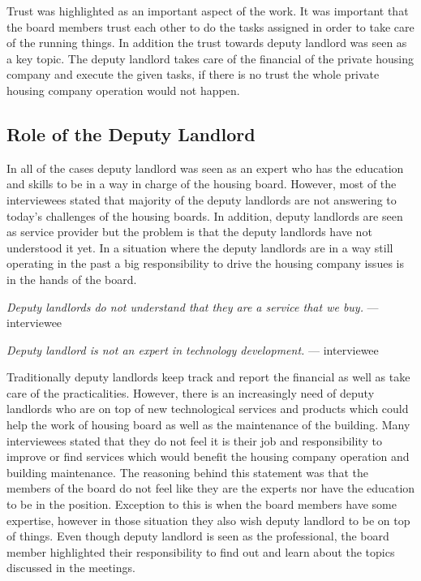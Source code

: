 Trust was highlighted as an important aspect of the work. It was important that the board members trust each other to do the tasks assigned in order to take care of the running things. In addition the trust towards deputy landlord was seen as a key topic. The deputy landlord takes care of the financial of the private housing company and execute the given tasks, if there is no trust the whole private housing company operation would not happen.

\subsection{Role of the Deputy Landlord}

In all of the cases deputy landlord was seen as an expert who has the education and skills to be in a way in charge of the housing board. However, most of the interviewees stated that majority of the deputy landlords are not answering to today's challenges of the housing boards. In addition, deputy landlords are seen as service provider but the problem is that the deputy landlords have not understood it yet. In a situation where the deputy landlords are in a way still operating in the past a big responsibility to drive the housing company issues is in the hands of the board.

\begin{displayquote}
\textit{Deputy landlords do not understand that they are a service that we buy.} --- interviewee
\end{displayquote}

\begin{displayquote}
\textit{Deputy landlord is not an expert in technology development.} --- interviewee
\end{displayquote}

Traditionally deputy landlords keep track and report the financial as well as take care of the practicalities. However, there is an increasingly need of deputy landlords who are on top of new technological services and products which could help the work of housing board as well as the maintenance of the building. Many interviewees stated that they do not feel it is their job and responsibility to improve or find services which would benefit the housing company operation and building maintenance. The reasoning behind this statement was that the members of the board do not feel like they are the experts nor have the education to be in the position. Exception to this is when the board members have some expertise, however in those situation they also wish deputy landlord to be on top of things. Even though deputy landlord is seen as the professional, the board member highlighted their responsibility to find out and learn about the topics discussed in the meetings.

